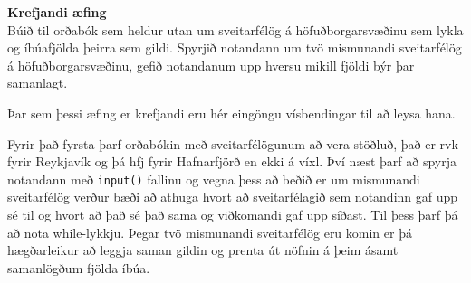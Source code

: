 \begin{exercise}\label{dic7}
\textbf{Krefjandi æfing}\\
Búið til orðabók sem heldur utan um sveitarfélög á höfuðborgarsvæðinu sem lykla og íbúafjölda þeirra sem gildi.
Spyrjið notandann um tvö mismunandi sveitarfélög á höfuðborgarsvæðinu, gefið notandanum upp hversu mikill fjöldi býr þar samanlagt.
\end{exercise}
\begin{Answer}[ref={dic7}]
Þar sem þessi æfing er krefjandi eru hér eingöngu vísbendingar til að leysa hana.

Fyrir það fyrsta þarf orðabókin með sveitarfélögunum að vera stöðluð, það er rvk fyrir Reykjavík og þá hfj fyrir Hafnarfjörð en ekki á víxl.
Því næst þarf að spyrja notandann með \texttt{input()} fallinu og vegna þess að beðið er um mismunandi sveitarfélög verður bæði að athuga hvort að sveitarfélagið sem notandinn gaf upp sé til og hvort að það sé það sama og viðkomandi gaf upp síðast.
Til þess þarf þá að nota while-lykkju.
Þegar tvö mismunandi sveitarfélög eru komin er þá hægðarleikur að leggja saman gildin og prenta út nöfnin á þeim ásamt samanlögðum fjölda íbúa.
\end{Answer}


